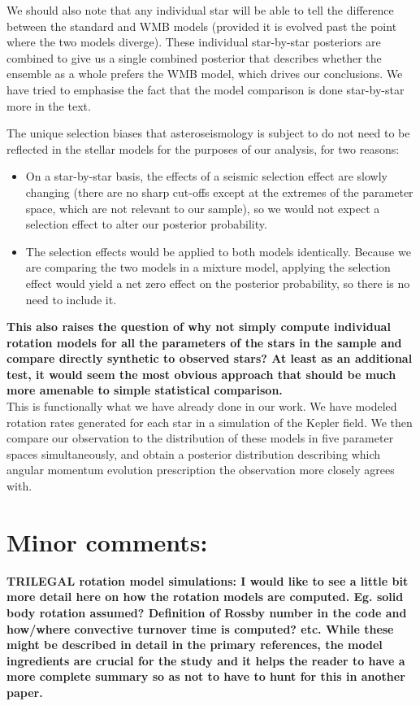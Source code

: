 \documentclass[11pt]{article}
\begin{document}
We should also note that any individual star will be able to tell the difference between the standard and WMB models (provided it is evolved past the point where the two models diverge). These individual star-by-star posteriors are combined to give us a single combined posterior that describes whether the ensemble as a whole prefers the WMB model, which drives our conclusions. We have tried to emphasise the fact that the model comparison is done star-by-star more in the text.

The unique selection biases that asteroseismology is subject to do not need to be reflected in the stellar models for the purposes of our analysis, for two reasons:
\begin{itemize}
\item On a star-by-star basis, the effects of a seismic selection effect are slowly changing (there are no sharp cut-offs except at the extremes of the parameter space, which are not relevant to our sample), so we would not expect a selection effect to alter our posterior probability.
\item The selection effects would be applied to both models identically. Because we are comparing the two models in a mixture model, applying the selection effect would yield a net zero effect on the posterior probability, so there is no need to include it.\\
\end{itemize}

\noindent\textbf{This also raises the question of why not simply compute individual rotation models for all the parameters of the stars in the sample and compare directly synthetic to observed stars? At least as an additional test, it would seem the most obvious approach that should be much more amenable to simple statistical comparison.}\\

This is functionally what we have already done in our work. We have modeled rotation rates generated for each star in a simulation of the Kepler field. We then compare our observation to the distribution of these models in five parameter spaces simultaneously, and obtain a posterior distribution describing which angular momentum evolution prescription the observation more closely agrees with.\\

\section*{Minor comments:}
\noindent\textbf{TRILEGAL rotation model simulations:
I would like to see a little bit more detail here on how the rotation models are computed.  Eg. solid body rotation assumed? Definition of Rossby number in the code and how/where convective turnover time is computed? etc.  While these might be described in detail in the primary references, the model ingredients are crucial for the study and it helps the reader to have a more complete summary so as not to have to hunt for this in another paper.}\\
\end{document}
